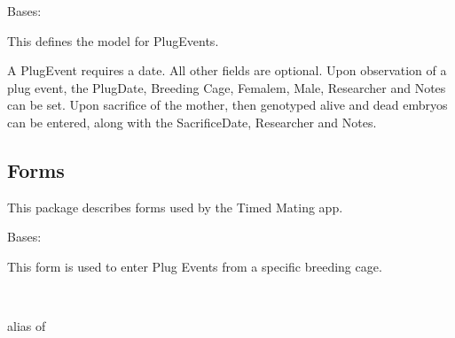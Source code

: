 \documentclass[letterpaper,10pt,english]{sphinxmanual}
\begin{document}
\begin{fulllineitems}
Bases: 

This defines the model for PlugEvents.

A PlugEvent requires a date.  All other fields are optional.
Upon observation of a plug event, the PlugDate, Breeding Cage, Femalem, Male, Researcher and Notes can be set.
Upon sacrifice of the mother, then genotyped alive and dead embryos can be entered, along with the SacrificeDate, Researcher and Notes.

\end{fulllineitems}



\subsection{Forms}
\label{api:id7}\label{api:module-timed_mating.forms}
This package describes forms used by the Timed Mating app.


\begin{fulllineitems}
\label{api:timed_mating.forms.BreedingPlugForm}
Bases: 

This form is used to enter Plug Events from a specific breeding cage.


\begin{fulllineitems}
\label{api:timed_mating.forms.BreedingPlugForm.Meta}~

\begin{fulllineitems}
\label{api:timed_mating.forms.BreedingPlugForm.Meta.model}
alias of 

\end{fulllineitems}


\end{fulllineitems}



\begin{fulllineitems}
\label{api:timed_mating.forms.BreedingPlugForm.media}
\end{fulllineitems}


\end{fulllineitems}
\end{document}
